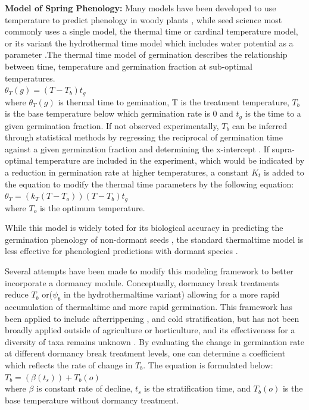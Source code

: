\documentclass[12pt]{article}\usepackage[]{graphicx}\usepackage[]{color}
\begin{document}
\textbf{Model of Spring Phenology:} Many models have been developed to use temperature to predict phenology in woody plants \citep{Chuine2002}, while seed science most commonly uses a single model, the thermal time or cardinal temperature model, or its variant the hydrothermal time model which includes water potential as a parameter \citep {Bradford2002}.The thermal time model of germination describes the relationship between time, temperature and germination fraction at sub-optimal temperatures.\\
\indent$\theta_{T}(g)=(T-T_{b})t_{g}$\\
where $\theta_{T}(g)$ is thermal time to gemination, T is the treatment temperature, $T_b$ is the base temperature below which germination rate is 0 and $t_g$ is the time to a given germination fraction. If not observed experimentally, $T_b$ can be inferred through statistical methods by regressing the reciprocal of germination time against a given germination fraction and determining the x-intercept \citep{Pritchard1999}.
If supra-optimal temperature are included in the experiment, which would be indicated by a reduction in germination rate at higher temperatures, a constant $K_t$ is added to the equation to modify the thermal time parameters by the following equation:\\
\indent$\theta_{T}=(k_{T}(T-T_{o}))(T-T_{b})t_{g}$\\
where $T_o$ is the optimum temperature.
\par While this model is widely toted for its biological accuracy in predicting the germination phenology of non-dormant seeds \citep{Bradford2005}, the standard thermaltime model is less effective for phenological predictions with dormant species \citep{Batlla2015}.
\par Several attempts have been made to modify this modeling framework to better incorporate a dormancy module. Conceptually, dormancy break treatments reduce $T_b$ or($\psi_b$ in the hydrothermaltime variant) allowing for a more rapid accumulation of thermaltime and more rapid germination. This framework has been applied to include afterrippening \citep{Meyer2000}, and cold stratification\citep{Pritchard1996,Batlla2003}, but has not been broadly applied outside of agriculture or horticulture, and its effectiveness for a diversity of taxa remains unknown \citep{Steadman2004}. By evaluating the change in germination rate at different dormancy break treatment levels, one can determine a coefficient which reflects the rate of change in $T_b$. The equation is formulated below:\\
\indent$T_b= (\beta(t_s))+T_b(o)$\\
where $\beta$ is constant rate of decline, $t_s$ is the stratification time, and $T_b(o)$ is the base temperature without dormancy treatment.
\end{document}
